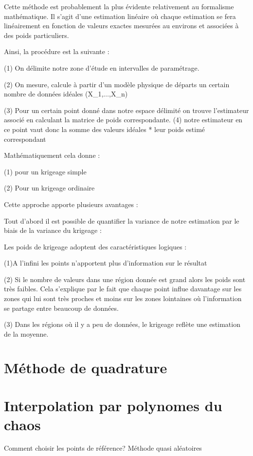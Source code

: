 \documentclass[hidelinks,12pt]{article}
\begin{document}
Cette méthode est probablement la plus évidente relativement au formalisme mathématique. Il s'agit d'une estimation linéaire où chaque estimation se fera linéairement en fonction de valeurs exactes mesurées au environs et associées à des poids particuliers.

Ainsi, la procédure est la suivante :

(1) On délimite notre zone d'étude en intervalles de paramétrage.

(2) On mesure, calcule à partir d'un modèle physique de départs un certain nombre de données idéales (X_1,$\ldots$,X_n)

(3) Pour un certain point donné dans notre espace délimité on trouve l'estimateur associé en calculant la matrice de poids correspondante.
(4) notre estimateur en ce point vaut donc la somme des valeurs idéales * leur poids estimé correspondant

Mathématiquement cela donne :

(1) pour un krigeage simple




(2) Pour un krigeage ordinaire

Cette approche apporte plusieurs avantages :


Tout d'abord il est possible de quantifier la variance de notre estimation par le biais de la variance du krigeage :



Les poids de krigeage adoptent des caractéristiques logiques :

(1)A l'infini les points n'apportent plus d'information sur le résultat

(2) Si le nombre de valeurs dans une région donnée est grand alors les poids sont très faibles. Cela s'explique par le fait que chaque point influe davantage sur les zones qui lui sont très proches et moins sur les zones lointaines où l'information se partage entre beaucoup de données.

(3) Dans les régions où il y a peu de données, le krigeage reflète une estimation de la moyenne.

\section{Méthode de quadrature}
\section{Interpolation par polynomes du chaos}


Comment choisir les points de référence? Méthode quasi aléatoires
\end{document}
